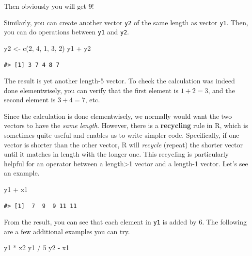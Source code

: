 \documentclass[
]{book}
\newenvironment{Shaded}{\begin{snugshade}}{\end{snugshade}}
\newcommand{\DecValTok}[1]{\textcolor[rgb]{0.00,0.00,0.81}{#1}}
\newcommand{\FunctionTok}[1]{\textcolor[rgb]{0.00,0.00,0.00}{#1}}
\newcommand{\NormalTok}[1]{#1}
\newcommand{\OtherTok}[1]{\textcolor[rgb]{0.56,0.35,0.01}{#1}}
\newcommand{\SpecialCharTok}[1]{\textcolor[rgb]{0.00,0.00,0.00}{#1}}
\begin{document}
Then obviously you will get 9!

Similarly, you can create another vector \texttt{y2} of the same length as vector \texttt{y1}. Then, you can do operations between \texttt{y1} and \texttt{y2}.

\begin{Shaded}
\begin{Highlighting}[]
\NormalTok{y2 }\OtherTok{\textless{}{-}} \FunctionTok{c}\NormalTok{(}\DecValTok{2}\NormalTok{, }\DecValTok{4}\NormalTok{, }\DecValTok{1}\NormalTok{, }\DecValTok{3}\NormalTok{, }\DecValTok{2}\NormalTok{)}
\NormalTok{y1 }\SpecialCharTok{+}\NormalTok{ y2}
\end{Highlighting}
\end{Shaded}

\begin{verbatim}
#> [1] 3 7 4 8 7
\end{verbatim}

The result is yet another length-5 vector. To check the calculation was indeed done elementwisely, you can verify that the first element is \(1 + 2 = 3\), and the second element is \(3 + 4 = 7\), etc.

Since the calculation is done elementwisely, we normally would want the two vectors to have the \emph{same length}. However, there is a \textbf{recycling} rule in R, which is sometimes quite useful and enables us to write simpler code. Specifically, if one vector is shorter than the other vector, R will \emph{recycle} (repeat) the shorter vector until it matches in length with the longer one. This recycling is particularly helpful for an operator between a length\textgreater1 vector and a length-1 vector. Let's see an example.

\begin{Shaded}
\begin{Highlighting}[]
\NormalTok{y1 }\SpecialCharTok{+}\NormalTok{ x1}
\end{Highlighting}
\end{Shaded}

\begin{verbatim}
#> [1]  7  9  9 11 11
\end{verbatim}

From the result, you can see that each element in \texttt{y1} is added by 6. The following are a few additional examples you can try.

\begin{Shaded}
\begin{Highlighting}[]
\NormalTok{y1 }\SpecialCharTok{*}\NormalTok{ x2}
\NormalTok{y1 }\SpecialCharTok{/} \DecValTok{5}
\NormalTok{y2 }\SpecialCharTok{{-}}\NormalTok{ x1}
\end{Highlighting}
\end{Shaded}
\end{document}
